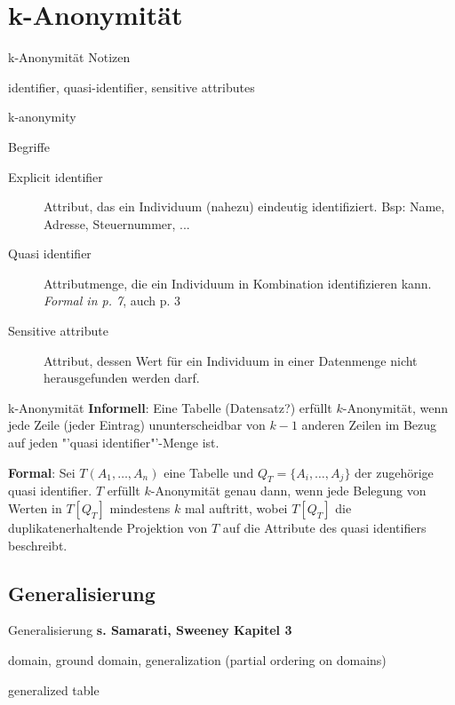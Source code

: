 \section{k-Anonymität}

\begin{frame}{k-Anonymität}
Notizen

identifier, quasi-identifier, sensitive attributes

k-anonymity
\end{frame}

\begin{frame}{Begriffe}
	\begin{description}
	\item[Explicit identifier] Attribut, das ein Individuum (nahezu) eindeutig identifiziert. Bsp: Name, Adresse, Steuernummer, ...
	\item[Quasi identifier] Attributmenge, die ein Individuum in Kombination identifizieren kann. \textit{Formal in \cite{sweeney_k_anonymity} p. 7}, auch \cite{machanavajjhala_l_diversity} p. 3
	\item[Sensitive attribute] Attribut, dessen Wert für ein Individuum in einer Datenmenge nicht herausgefunden werden darf.
	\end{description}
\end{frame}

\begin{frame}{k-Anonymität}
	\textbf{Informell}: Eine Tabelle (Datensatz?) erfüllt \(k\)-Anonymität, wenn jede Zeile (jeder Eintrag) ununterscheidbar von \(k-1\) anderen Zeilen im Bezug auf jeden "'quasi identifier"'-Menge ist.

	\vspace{0.5cm}

	\textbf{Formal}: Sei \(T(A_1, \dots , A_n)\) eine Tabelle und \(Q_T=\{A_i, \dots, A_j\}\) der zugehörige quasi identifier. \(T\) erfüllt \(k\)-Anonymität genau dann, wenn jede Belegung von Werten in \(T[Q_T]\) mindestens \(k\) mal auftritt, wobei \(T[Q_T]\) die duplikatenerhaltende Projektion von \(T\) auf die Attribute des quasi identifiers beschreibt.
\end{frame}

\subsection{Generalisierung}

\begin{frame}{Generalisierung}
	\textbf{s. Samarati, Sweeney Kapitel 3}
	
	domain, ground domain, generalization (partial ordering on domains)
	
	generalized table
\end{frame}


